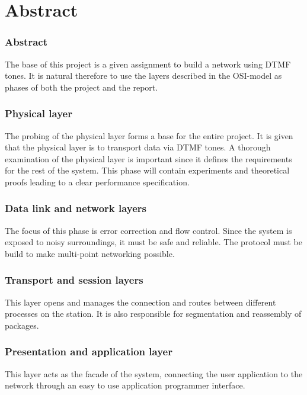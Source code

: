 \chapter*{Abstract}
\subsection{Abstract}
The base of this project is a given assignment to build a network using DTMF
tones. It is natural therefore to use the layers described in the OSI-model as
phases of both the project and the report.

\subsection{Physical layer}
The probing of the physical layer forms a base for the entire project. It is
given that the physical layer is to transport data via DTMF tones. A thorough
examination of the physical layer is important since it defines the requirements
for the rest of the system. This phase will contain experiments and theoretical
proofs leading to a clear performance specification.

\subsection{Data link and network layers}
The focus of this phase is error correction and flow control. Since the system
is exposed to noisy surroundings, it must be safe and reliable. The protocol
must be build to make multi-point networking possible.

\subsection{Transport and session layers}
This layer opens and manages the connection and routes between different
processes on the station. It is also responsible for segmentation and reassembly
of packages.

\subsection{Presentation and application layer}
This layer acts as the facade of the system, connecting the user application to
the network through an easy to use application programmer interface.
